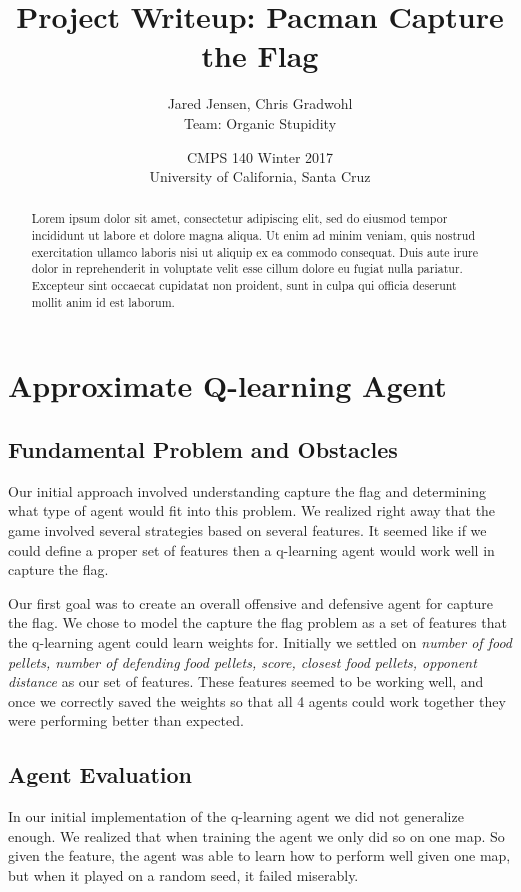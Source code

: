 \documentclass[11pt]{article}
\begin{document}
\title{Project Writeup: Pacman Capture the Flag}
\author{Jared Jensen, Chris Gradwohl \\ Team: Organic Stupidity}
\date{CMPS 140 Winter 2017 \\ University of California, Santa Cruz}
\maketitle


\begin{abstract}
	Lorem ipsum dolor sit amet, consectetur adipiscing elit,
	sed do eiusmod tempor incididunt ut labore et dolore magna
	aliqua. Ut enim ad minim veniam, quis nostrud exercitation
	ullamco laboris nisi ut aliquip ex ea commodo consequat.
	Duis aute irure dolor in reprehenderit in voluptate velit
	esse cillum dolore eu fugiat nulla pariatur. Excepteur sint
	occaecat cupidatat non proident, sunt in culpa qui officia
	deserunt mollit anim id est laborum.
\end{abstract}


\section{Approximate Q-learning Agent}

\subsection{Fundamental Problem and Obstacles}
Our initial approach involved understanding capture the flag and determining
what type of agent would fit into this problem. We realized right away that
the game involved several strategies based on several features. It seemed like
if we could define a proper set of features then a q-learning agent would work
well in capture the flag. \

Our first goal was to create an overall offensive and defensive agent for capture the flag. We
chose to model the capture the flag problem as a set of features that the q-learning agent
could learn weights for. Initially we settled on \textit{number of food pellets, number of defending food pellets, score,
closest food pellets, opponent distance} as our set of features. These features seemed
to be working well, and once we correctly saved the weights so that all 4 agents could work together
they were performing better than expected. \

\subsection{Agent Evaluation}
In our initial implementation of the q-learning agent we did not generalize enough. We realized
that when training the agent we only did so on one map. So given the feature, the agent
was able to learn how to perform well given one map, but when it played on a random seed, it
failed miserably. \
\end{document}
